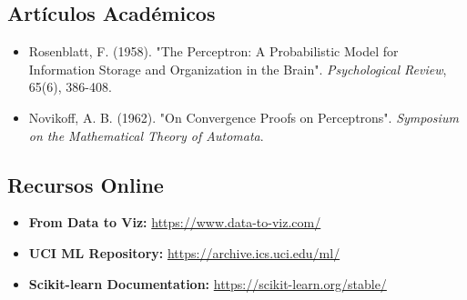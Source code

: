 \documentclass[12pt]{src/formato_utem}
\begin{document}
\subsection*{Artículos Académicos}

\begin{itemize}
    \item Rosenblatt, F. (1958). "The Perceptron: A Probabilistic Model for Information Storage and Organization in the Brain". \textit{Psychological Review}, 65(6), 386-408.
    
    \item Novikoff, A. B. (1962). "On Convergence Proofs on Perceptrons". \textit{Symposium on the Mathematical Theory of Automata}.
\end{itemize}

\subsection*{Recursos Online}

\begin{itemize}
    \item \textbf{From Data to Viz:} \url{https://www.data-to-viz.com/}
    \item \textbf{UCI ML Repository:} \url{https://archive.ics.uci.edu/ml/}
    \item \textbf{Scikit-learn Documentation:} \url{https://scikit-learn.org/stable/}
\end{itemize}
\end{document}
